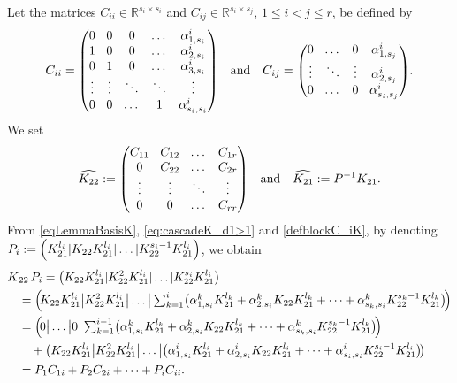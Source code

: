 \documentclass[10pt]{amsart}
\let\ts\textstyle
\theoremstyle{plain}
\theoremstyle{definition}
\theoremstyle{remark}
\newcommand{\set}{\mathbb}
\newcommand{\R}{} %
\renewcommand{\R}{\set{R}}
\newcommand{\coloneqq}{\mathrel{\mathord{:}\mathord=}}
\let\originalleft\left
\let\originalright\right
\renewcommand{\left}{\mathopen{}\mathclose\bgroup\originalleft}
\renewcommand{\right}{\aftergroup\egroup\originalright}
\begin{document}
Let the matrices $C_{ii} \in \R^{s_i \times s_i}$ and $C_{ij} \in \R^{s_i \times s_j}$, $1 \leq i < j \leq r$, be defined by
\begin{equation}\arraycolsep4.5pt
C_{ii} = \begin{pmatrix} 0 & 0 & 0 & \dots & \alpha_{1, s_i}^i\\
1 & 0 & 0 & \dots & \alpha_{2, s_i}^i\\
0 & 1 & 0 & \dots & \alpha_{3, s_i}^i \\
\vdots & \vdots & \ddots & \ddots & \vdots\\
0 & 0 & \dots & 1 & \alpha_{s_i,s_i}^i
\end{pmatrix}\quad \text{and}\quad
C_{ij} = \begin{pmatrix} 0 & \dots & 0 & \alpha_{1, s_j}^i\\
\vdots & \ddots & \vdots & \alpha_{2, s_j}^i\\
0 & \dots & 0 & \alpha_{s_i,s_j}^i
\end{pmatrix}.
\label{defblockC_iK}
\end{equation}
We set
\begin{equation}
\label{eq:cascadeK_d1>1}\arraycolsep4.5pt
\widehat{K_{22}}\coloneqq \begin{pmatrix} C_{11} & C_{12} & \dots & C_{1r}\\
0 & C_{22} &\dots &C_{2r}\\
\vdots & \vdots & \ddots & \vdots \\
0 & 0 &\dots & C_{rr}\\
\end{pmatrix}\quad \text{and}\quad
\widehat{K_{21}}\coloneqq P^{-1} K_{21}.
\end{equation}
From \eqref{eqLemmaBasisK}, \eqref{eq:cascadeK_d1>1} and \eqref{defblockC_iK}, by denoting $P_ i \coloneqq \left(K_{21}^{l_i} | K_{22} K_{21}^{l_i} | \dots | K_{22}^{s_i-1} K_{21}^{l_i}\right)$, we obtain
\begin{align*}
K&_{22}\, P_i = \bigl(K_{22}K_{21}^{l_i} | K_{22}^2 K_{21}^{l_i} | \dots | K_{22}^{s_i} K_{21}^{l_i}\bigr)\\
&= \Bigl(\!K_{22}K_{21}^{l_i} \big| K_{22}^2 K_{21}^{l_i} \big| \dots \big| \ts\sum_{k=1}^i \bigl(\alpha_{1, s_i}^k K_{21}^{l_k} + \alpha_{2, s_i}^k K_{22} K_{21}^{l_k} + \dots + \alpha_{s_k,s_i}^k K_{22}^{s_k-1} K_{21}^{l_k}\bigr)\! \Bigr)\\
&= \Bigl(\!0 \big| \dots \big| 0 \big| \ts\sum_{k=1}^{i-1} \bigl(\alpha_{1, s_i}^k K_{21}^{l_k} + \alpha_{2, s_i}^k K_{22} K_{21}^{l_k} + \dots + \alpha_{s_k,s_i}^k K_{22}^{s_k-1} K_{21}^{l_k}\bigr)\! \Bigr)\\
&\quad + \bigl(K_{22}K_{21}^{l_i} \big| K_{22}^2 K_{21}^{l_i} \big| \dots \big| \bigl(\alpha_{1, s_i}^i K_{21}^{l_i} + \alpha_{2, s_i}^i K_{22} K_{21}^{l_i} + \dots + \alpha_{s_i,s_i}^i K_{22}^{s_i-1} K_{21}^{l_i}\bigr)\! \bigr) \\
&= P_1 C_{1i} + P_{2} C_{2i} + \dots + P_{i} C_{ii}.
\end{align*}
\end{document}
